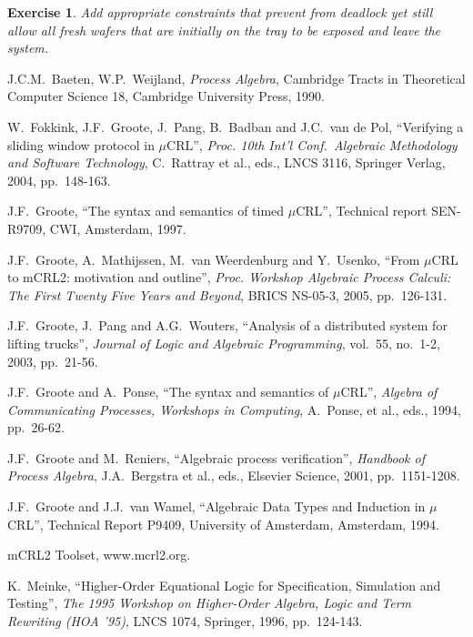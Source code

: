 \documentclass[a4paper,fleqn]{article}
\newtheorem{thexercise}[thdefinition]{Exercise}
\newenvironment{exercise}
  {\begin{thexercise}\em}
  {\end{thexercise}}
\newcommand{\frm}[1]{\mbox{\ensuremath{#1}}}
\newcommand{\mCRL}{\frm{\mu}CRL\xspace}
\begin{document}
\begin{exercise}
Add appropriate constraints that prevent from deadlock yet still allow all fresh
wafers that are initially on the tray to be exposed and leave the system.
\end{exercise}

\begin{thebibliography}{99}

J.C.M.\ Baeten, W.P.\ Weijland,
\emph{Process Algebra},
Cambridge Tracts in Theoretical Computer Science 18, Cambridge University Press,
1990.

W.\ Fokkink, J.F.\ Groote, J.\ Pang, B.\ Badban and J.C.\ van de
Pol, ``Verifying a sliding window protocol in \mCRL'', \emph{Proc.
10th Int'l Conf.\ Algebraic Methodology and Software Technology},
C.\ Rattray et al., eds., LNCS 3116, Springer Verlag, 2004, pp.\
148-163.

J.F.\ Groote,
``The syntax and semantics of timed \mCRL'',
Technical report SEN-R9709, CWI, Amsterdam, 1997.

J.F.\ Groote, A.\ Mathijssen, M.\ van Weerdenburg and Y.\ Usenko,
``From \mCRL to mCRL2: motivation and outline'',
\emph{Proc. Workshop Algebraic Process Calculi: The First
Twenty Five Years and Beyond}, BRICS NS-05-3, 2005, pp.\ 126-131.

J.F.\ Groote, J.\ Pang and A.G.\ Wouters,
``Analysis of a distributed system for lifting trucks'',
\emph{Journal of Logic and Algebraic Programming},
vol.\ 55, no.\ 1-2, 2003, pp.\ 21-56.

J.F.\ Groote and A.\ Ponse,
``The syntax and semantics of \mCRL'',
\emph{Algebra of Communicating Processes, Workshops in Computing},
A.\ Ponse, et al., eds., 1994, pp.\ 26-62.

J.F.\ Groote and M.\ Reniers,
``Algebraic process verification'',
\emph{Handbook of Process Algebra},
J.A.\ Bergstra et al., eds., Elsevier Science, 2001, pp.\ 1151-1208.

J.F.\ Groote and J.J.\ van Wamel, ``Algebraic Data Types and
Induction in \mCRL'', Technical Report P9409, University of Amsterdam,
Amsterdam, 1994.

mCRL2 Toolset, www.mcrl2.org.

K.\ Meinke, ``Higher-Order Equational Logic for Specification,
Simulation and Testing'', \emph{The 1995 Workshop on Higher-Order
Algebra, Logic and Term Rewriting (HOA '95)}, LNCS 1074, Springer,
1996, pp.\ 124-143.


\end{thebibliography}
\end{document}
